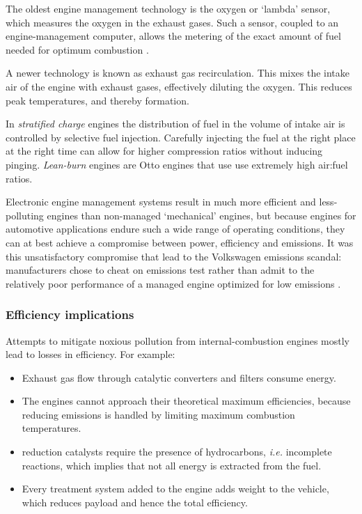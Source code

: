 The oldest engine management technology is the oxygen or `lambda' sensor, which
measures the oxygen in the exhaust gases. Such a sensor, coupled to an
engine-management computer, allows the me\-ter\-ing of the exact amount of fuel
need\-ed for op\-ti\-mum combustion \autocite{Frauhammer2014}.

A newer technology is known as exhaust gas recirculation. This mixes the intake
air of the engine with exhaust gases, effectively diluting the oxygen. This
reduces peak temperatures, and thereby \nox formation.

In \textit{stratified charge} engines the distribution of fuel in the volume of
intake air is controlled by selective fuel injection. Carefully injecting the
fuel at the right place at the right time can allow for higher compression
ratios without inducing pinging. \textit{Lean-burn} engines are Otto engines
that use use extremely high air:fuel ratios.

Electronic engine management systems result in much more efficient and
less-polluting engines than non-managed `mechanical' engines, but because
engines for automotive applications endure such a wide range of operating
conditions, they can at best achieve a compromise between power, efficiency and
emissions. It was this unsatisfactory compromise that lead to the Volkswagen
emissions scandal: manufacturers chose to cheat on emissions test rather than
admit to the relatively poor performance of a managed engine optimized for low
emissions \autocite{Mansouri2016}.

\subsubsection{Efficiency implications}

Attempts to mitigate noxious pollution from internal\hyp{}combustion engines
mostly lead to losses in efficiency. For example:

\begin{itemize}

\item Exhaust gas flow through catalytic converters and filters consume energy.
  
\item The engines cannot approach their theoretical maximum efficiencies,
because reducing \nox emissions is handled by limiting maximum combustion
temperatures.

\item \nox reduction catalysts require the presence of hydrocarbons,
\textit{i.e.} incomplete reactions, which implies that not all energy is
extracted from the fuel.

\item Every treatment system added to the engine adds weight to the vehicle, which
reduces payload and hence the total efficiency.

\end{itemize}

